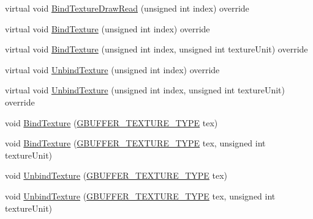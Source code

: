 \begin{DoxyCompactItemize}
\item 
virtual void \mbox{\hyperlink{class_geometry_engine_1_1_geometry_buffer_1_1_g_buffer_a1df706f920cc9a2b15609c6c7e179130}{Bind\+Texture\+Draw\+Read}} (unsigned int index) override
\item 
virtual void \mbox{\hyperlink{class_geometry_engine_1_1_geometry_buffer_1_1_g_buffer_a2c9c631c31f0bda3c9f01c4402819e4b}{Bind\+Texture}} (unsigned int index) override
\item 
virtual void \mbox{\hyperlink{class_geometry_engine_1_1_geometry_buffer_1_1_g_buffer_a9a6d75cdb98cc00e34648f5f423382f1}{Bind\+Texture}} (unsigned int index, unsigned int texture\+Unit) override
\item 
virtual void \mbox{\hyperlink{class_geometry_engine_1_1_geometry_buffer_1_1_g_buffer_a3034ecd5b07b64a0cb7af24f5c6f80ae}{Unbind\+Texture}} (unsigned int index) override
\item 
virtual void \mbox{\hyperlink{class_geometry_engine_1_1_geometry_buffer_1_1_g_buffer_a1f02674c4ff24debb9f4b1b6d1243a9b}{Unbind\+Texture}} (unsigned int index, unsigned int texture\+Unit) override
\item 
void \mbox{\hyperlink{class_geometry_engine_1_1_geometry_buffer_1_1_g_buffer_a6a2469afe0c79b97d35ba5d2b6a1ae52}{Bind\+Texture}} (\mbox{\hyperlink{class_geometry_engine_1_1_geometry_buffer_1_1_g_buffer_a718dceafcac1915f7de061108597e1cc}{G\+B\+U\+F\+F\+E\+R\+\_\+\+T\+E\+X\+T\+U\+R\+E\+\_\+\+T\+Y\+PE}} tex)
\item 
void \mbox{\hyperlink{class_geometry_engine_1_1_geometry_buffer_1_1_g_buffer_a3142603e5ce9519da6d4aba1d07fec1f}{Bind\+Texture}} (\mbox{\hyperlink{class_geometry_engine_1_1_geometry_buffer_1_1_g_buffer_a718dceafcac1915f7de061108597e1cc}{G\+B\+U\+F\+F\+E\+R\+\_\+\+T\+E\+X\+T\+U\+R\+E\+\_\+\+T\+Y\+PE}} tex, unsigned int texture\+Unit)
\item 
void \mbox{\hyperlink{class_geometry_engine_1_1_geometry_buffer_1_1_g_buffer_a15ffb63e72295abb6a10b2481fb878e4}{Unbind\+Texture}} (\mbox{\hyperlink{class_geometry_engine_1_1_geometry_buffer_1_1_g_buffer_a718dceafcac1915f7de061108597e1cc}{G\+B\+U\+F\+F\+E\+R\+\_\+\+T\+E\+X\+T\+U\+R\+E\+\_\+\+T\+Y\+PE}} tex)
\item 
void \mbox{\hyperlink{class_geometry_engine_1_1_geometry_buffer_1_1_g_buffer_a0bbb50c4eabcee8677a3da316042c44e}{Unbind\+Texture}} (\mbox{\hyperlink{class_geometry_engine_1_1_geometry_buffer_1_1_g_buffer_a718dceafcac1915f7de061108597e1cc}{G\+B\+U\+F\+F\+E\+R\+\_\+\+T\+E\+X\+T\+U\+R\+E\+\_\+\+T\+Y\+PE}} tex, unsigned int texture\+Unit)

\end{DoxyCompactItemize}
